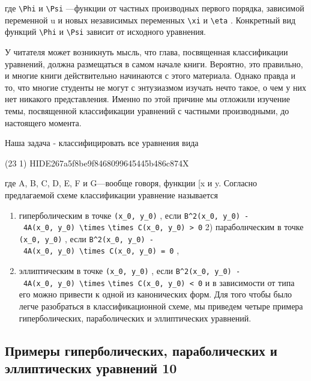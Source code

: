 \documentclass[
  ukrainian,
]{article}
\begin{document}
где \texttt{\textbackslash{}Phi} и \texttt{\textbackslash{}Psi}
---функции от частных производных первого порядка, зависимой переменной
u и новых независимых переменных \texttt{\textbackslash{}xi} и
\texttt{\textbackslash{}eta} . Конкретный вид функций
\texttt{\textbackslash{}Phi} и \texttt{\textbackslash{}Psi} зависит от
исходного уравнения.

У читателя может возникнуть мысль, что глава, посвященная классификации
уравнений, должна размещаться в самом начале книги. Вероятно, это
правильно, и многие книги действительно начинаются с этого материала.
Однако правда и то, что многие студенты не могут с энтузиазмом изучать
нечто такое, о чем у них нет никакого представления. Именно по этой
причине мы отложили изучение темы, посвященной классификации уравнений с
частными производными, до настоящего момента.

Наша задача - классифицировать все уравнения вида

(23 1) HIDE267a5f8be9f8468099645445b486c874X

где A, B, C, D, E, F и G---вообще говоря, функции {[}x и y. Согласно
предлагаемой схеме классификации уравнение называется

\begin{enumerate}
\def\labelenumi{\arabic{enumi})}
\item
  гиперболическим в точке \texttt{(x\_0,\ y\_0)} , если
  \texttt{B\^{}2(x\_0,\ y\_0)\ -\ 4A(x\_0,\ y\_0)\ \textbackslash{}times}
  \texttt{\textbackslash{}times\ C(x\_0,\ y\_0)\ \textgreater{}\ 0} 2)
  параболнческим в точке \texttt{(x\_0,\ y\_0)} , если
  \texttt{B\^{}2(x\_0,\ y\_0)\ -\ 4A(x\_0,\ y\_0)\ \textbackslash{}times\ C(x\_0,\ y\_0)\ =\ 0}
  ,
\item
  эллиптическим в точке \texttt{(x\_0,\ y\_0)} , если
  \texttt{B\^{}2(x\_0,\ y\_0)\ -\ 4A(x\_0,\ y\_0)\ \textbackslash{}times}
  \texttt{\textbackslash{}times\ C(x\_0,\ y\_0)\ \textless{}\ 0} и в
  зависимости от типа его можно привести к одной из канонических форм.
  Для того чтобы было легче разобраться в классификационной схеме, мы
  приведем четыре примера гиперболических, параболических и
  эллиптических уравнений.
\end{enumerate}

\subsection{Примеры гиперболических, параболических и эллиптических
уравнений
10}\label{ux43fux440ux438ux43cux435ux440ux44b-ux433ux438ux43fux435ux440ux431ux43eux43bux438ux447ux435ux441ux43aux438ux445-ux43fux430ux440ux430ux431ux43eux43bux438ux447ux435ux441ux43aux438ux445-ux438-ux44dux43bux43bux438ux43fux442ux438ux447ux435ux441ux43aux438ux445-ux443ux440ux430ux432ux43dux435ux43dux438ux439-10}
\end{document}
